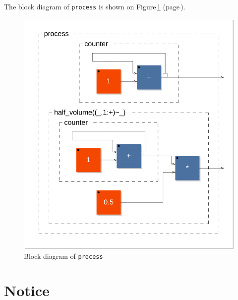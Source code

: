 \documentclass{article}
\begin{document}
The block diagram of \texttt{process} is shown on Figure\,\ref{figure1} (page\,\pageref{figure1}).
\begin{figure}[ht!]
	\centering
	\includegraphics[width=\textwidth]{../svg/svg-01/process}
	\caption{Block diagram of \texttt{process}}
	\label{figure1}
\end{figure}


\section{Notice}
\label{notice}
\end{document}
